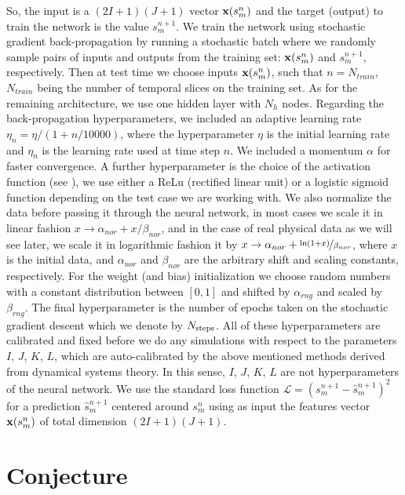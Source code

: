\documentclass[journal]{IEEEtran}
\begin{document}
So, the input is a
$(2 I+1)(J+1)$ vector ${\bf x}(s^n_m)$ and the target (output) to train the network is the value $s^{n+1}_{m}$.
 We train the network using stochastic gradient
back-propagation by running a stochastic batch
where we randomly sample pairs of inputs and outputs from the training set: ${\bf x}(s^n_m)$ and $s^{n+1}_{m}$, respectively. Then at test time
we choose inputs ${\bf x}(s^n_m)$, such that $n=N_{train}$, $N_{train}$ being the number of temporal slices on the training set.
As for the remaining architecture, we use one hidden layer with $N_h$ nodes.
Regarding the back-propagation hyperparameters, we included an adaptive learning rate $\eta_n=\eta/(1+n/10000)$, 
where the hyperparameter $\eta$ is the initial learning rate and $\eta_n$ is the learning rate used at time step
$n$. We included a momentum $\alpha$ for faster convergence.
 A further hyperparameter is the choice of the activation function (see \cite{9780262527019}), we use either a ReLu (rectified linear unit)
 or a logistic sigmoid function depending on the
 test case we are working with.
We also normalize the data before passing it through the neural network, in most cases we scale it in linear fashion
$x \to \alpha_{nor} + x/\beta_{nor}$, and in the case of real physical data as we will see later, 
we scale it in logarithmic fashion it by $x \to \alpha_{nor}+\nicefrac{\ln(1+x)}{\beta_{nor}}$, where $x$ is the initial data,
and $\alpha_{nor}$ and $\beta_{nor}$ are the arbitrary shift and scaling constants, respectively. For the weight (and bias)
initialization we choose random numbers with a constant distribution between $[0,1]$ and shifted by $\alpha_{rng}$ and scaled
by $\beta_{rng}$. The final hyperparameter is the number of epochs taken on the stochastic gradient descent
which we denote by $N_{\textnormal{steps}}$.  
All of these hyperparameters are calibrated and fixed
before we do any simulations with respect to the parameters $I$, $J$, $K$, $L$, which are auto-calibrated by the above mentioned
methods derived from dynamical systems theory. In this sense, $I$, $J$, $K$, $L$ are not hyperparameters of the neural network. We use the standard
loss function $\mathcal{L}=\left( s^{n+1}_{m} - \hat{s}^{n+1}_{m}\right)^2$ for a prediction $\hat{s}^{n+1}_{m}$ 
centered around $s^{n}_{m}$ using as input
the features vector ${\bf x}(s^n_m)$ of total dimension  $(2 I+1)(J+1)$.




\section{Conjecture}
\label{conjecturesection}
\end{document}
